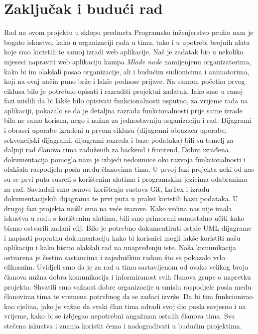 \chapter{Zaključak i budući rad}

		Rad na ovom projektu u sklopu predmeta Programsko inženjerstvo pružio nam je bogato iskustvo, kako u organizaciji rada u timu, tako i u upotrebi brojnih alata koje smo koristili te samoj izradi web aplikacije. 
		Naš je zadatak bio u nekoliko mjeseci napraviti web aplikaciju kampa \textit{Mlade nade} namijenjenu organizatorima, kako bi im olakšali posao organizacije, ali i budućim sudionicima i animatorima, koji na ovaj način puno brže i lakše podnose prijave.\newline
		\indent Na samom početku prvog ciklusa bilo je potrebno opisati i razraditi projektni zadatak. Iako smo u ranoj fazi mislili da bi lakše bilo opisivati funkcionalnosti usputno, za vrijeme rada na aplikaciji, pokazalo se da je detaljna razrada funkcionalnosti prije same izrade bila ne samo korisna, nego i nužna za jednostavniju organizaciju i rad. Dijagrami i obrasci uporabe izrađeni u prvom ciklusu (dijagrami obrazaca uporabe, sekvencijski dijagrami, dijagrami razreda i baze podataka) bili su temelj za daljnji rad članova tima zaduženih za backend i frontend. Dobro izrađena dokumentacija pomogla nam je izbjeći nedoumice oko razvoja funkcionalnosti i olakšala raspodjelu posla među članovima tima. U prvoj fazi projekta neki od nas su se prvi puta susreli s korištenim alatima i programskim jezicima odabranima za rad. Savladali smo osnove korištenja sustava Git, LaTex i izradu dokumentacijskih dijagrama te prvi puta u praksi koristili bazu podataka.\newline
		\indent U drugoj fazi projekta naišli smo na veće izazove. Kako većina nas nije imala iskustva u radu s korištenim alatima, bili smo primorani samostalno učiti kako bismo ostvarili zadani cilj. Bilo je potrebno dokumentirati ostale UML dijagrame i napisati popratnu dokumentaciju kako bi korisnici mogli lakše koristiti našu aplikaciju i kako bismo olakšali rad na unapređenju iste.\newline
		\indent Naša komunikacija ostvarena je čestim sastancima i zajedničkim radom što se pokazalo vrlo efikasnim. Uvidjeli smo da je za rad u timu sastavljenom od ovako velikog broja članova nužna dobra komunikacija i informiranost svih članova grupe o napretku projekta. Shvatili smo važnost dobre organizacije u smislu raspodjele posla među članovima tima te vremena potrebnog da se zadaci izvrše. Da bi tim funkcionirao kao cjelina, jako je važno da svaki član tima odradi svoj dio posla savjesno i na vrijeme, kako bi se izbjegao nepotrebni angažman ostalih članova tima. Sva stečena iskustva i znanja koristit ćemo i nadograđivati u budućim projektima.
		
		\eject 